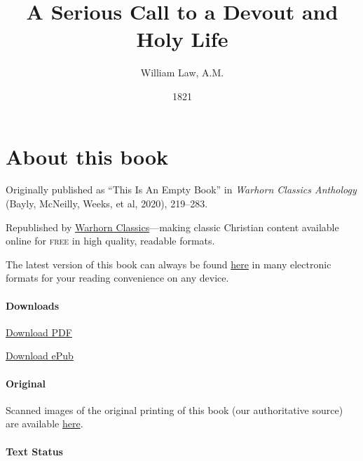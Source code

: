 \documentclass[
]{book}
\title{A Serious Call to a Devout and Holy Life}
\author{William Law, A.M.}
\date{1821}
\begin{document}
\maketitle

\mainmatter
{}

{
\setcounter{tocdepth}{1}
\tableofcontents
}
\hypertarget{about-this-book}{%
\chapter*{About this book}\label{about-this-book}}

Originally published as ``This Is An Empty Book'' in \emph{Warhorn Classics Anthology} (Bayly, McNeilly, Weeks, et al, 2020), 219--283.

Republished by \href{https://classics.warhornmedia.com/}{Warhorn Classics}---making classic Christian content available online for \textsc{free} in high quality, readable formats.

The latest version of this book can always be found \href{https://warhornmedia.github.io/law-serious-call/}{here} in many electronic formats for your reading convenience on any device.

\hypertarget{downloads}{%
\subsubsection*{Downloads}\label{downloads}}

\href{https://warhornmedia.github.io/law-serious-call//Law-A_Serious_Call_To_A_Devout_And_Holy_Life.pdf}{Download PDF}

\href{https://warhornmedia.github.io/law-serious-call//Law-A_Serious_Call_To_A_Devout_And_Holy_Life.epub}{Download ePub}

\hypertarget{original}{%
\subsubsection*{Original}\label{original}}

Scanned images of the original printing of this book (our authoritative source) are available \href{https://archive.org/details/aseriouscalltoa00unkngoog}{here}.

\hypertarget{text-status}{%
\subsubsection*{Text Status}\label{text-status}}
\end{document}

